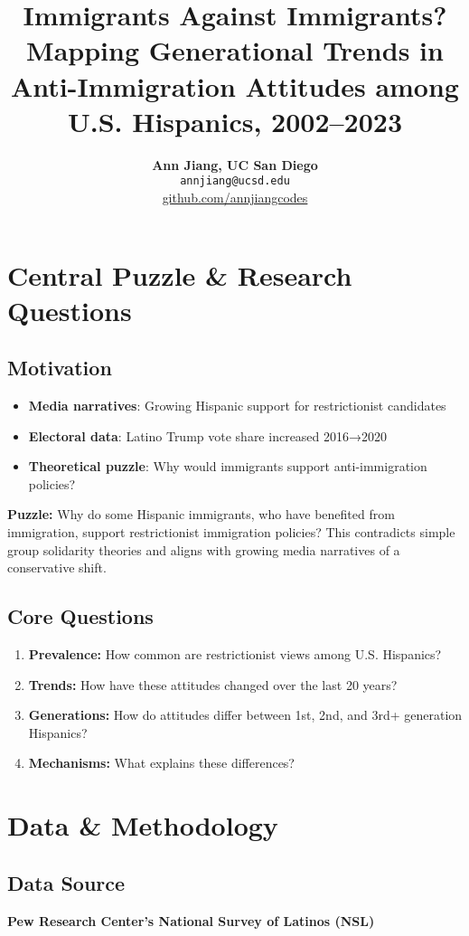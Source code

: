 \documentclass[11pt,letterpaper]{article}
\title{\textbf{\Large Immigrants Against Immigrants?} \\
\textbf{\large Mapping Generational Trends in Anti-Immigration Attitudes among U.S. Hispanics, 2002–2023}}
\author{\textbf{Ann Jiang, UC San Diego} \\ 
\texttt{annjiang@ucsd.edu} \\ 
\url{github.com/annjiangcodes}}
\date{}
\begin{document}
\maketitle

\section{Central Puzzle \& Research Questions}

\subsection{Motivation}
\begin{itemize}
    \item \textbf{Media narratives}: Growing Hispanic support for restrictionist candidates
    \item \textbf{Electoral data}: Latino Trump vote share increased 2016→2020
    \item \textbf{Theoretical puzzle}: Why would immigrants support anti-immigration policies?
\end{itemize}

\textbf{Puzzle:} Why do some Hispanic immigrants, who have benefited from immigration, support restrictionist immigration policies? This contradicts simple group solidarity theories and aligns with growing media narratives of a conservative shift.

\subsection{Core Questions}
\begin{enumerate}
    \item \textbf{Prevalence:} How common are restrictionist views among U.S. Hispanics?
    \item \textbf{Trends:} How have these attitudes changed over the last 20 years?
    \item \textbf{Generations:} How do attitudes differ between 1st, 2nd, and 3rd+ generation Hispanics?
    \item \textbf{Mechanisms:} What explains these differences?
\end{enumerate}

\section{Data \& Methodology}

\subsection{Data Source}
\textbf{Pew Research Center's National Survey of Latinos (NSL)}
\end{document}
